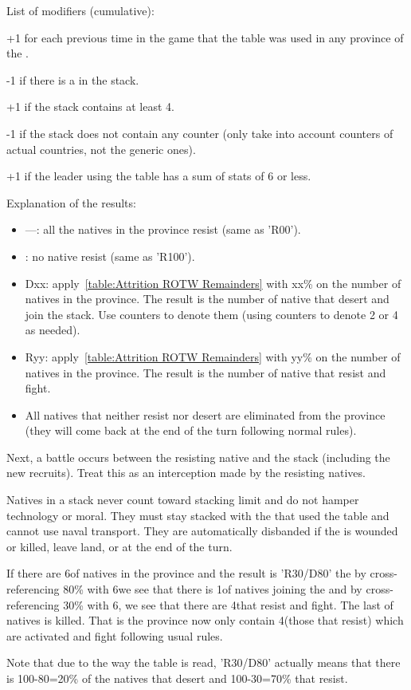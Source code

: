 List of modifiers (cumulative):
\begin{modlist}
\item[+1] for each previous time in the game that the table was used in any
  province of the \Area.
\item[-1] if there is a \LeaderMis in the stack.
\item[+1] if the stack contains at least 4\LD.
\item[-1] if the stack does not contain any \ARMY counter (only take into
  account counters of actual countries, not the generic  ones).
\item[+1] if the leader using the table has a sum of stats of 6 or less.
\end{modlist}

Explanation of the results:
\begin{itemize}
\item ---: all the natives in the province resist (same as 'R00').
\item \textdag: no native resist (same as 'R100').
\item Dxx: apply~\ref{table:Attrition ROTW Remainders} with xx\% on the
  number of natives in the province. The result is the number of native \LD
  that desert and join the stack. Use  counters to denote them
  (using \ARMY counters to denote 2 or 4 \LD as needed).
\item Ryy: apply~\ref{table:Attrition ROTW Remainders} with yy\% on the
  number of natives in the province. The result is the number of native \LD
  that resist and fight.
\item All natives that neither resist nor desert are eliminated from the
  province (they will come back at the end of the turn following normal
  rules).
\end{itemize}

Next, a battle occurs between the resisting native and the stack (including
the new recruits). Treat this as an interception made by the resisting
natives.

Natives in a stack never count toward stacking limit and do not hamper
technology or moral. They must stay stacked with the \LeaderC that used the
table and cannot use naval transport. They are automatically disbanded if the
\LeaderC is wounded or killed, leave land, or at the end of the turn.

\begin{exemple}
  If there are 6\LD of natives in the province and the result is 'R30/D80' the
  by cross-referencing 80\% with 6\LD we see that there is 1\LD of natives
  joining the \LeaderC and by cross-referencing 30\% with 6\LD, we see that
  there are 4\LD that resist and fight. The last \LD of natives is
  killed. That is the province now only contain 4\LD (those that resist) which
  are activated and fight following usual rules.

  Note that due to the way the table is read, 'R30/D80' actually means that
  there is 100-80=20\% of the natives that desert and 100-30=70\% that resist.
\end{exemple}

